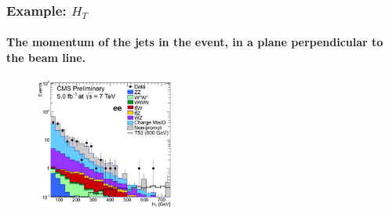 \documentclass[ukenglish]{beamer}
\begin{document}
\begin{frame}
    \frametitle{Example: $H_T$}
    \framesubtitle{The momentum of the jets in the event, in a plane
    perpendicular to the beam line.}
    \begin{figure}[h]
        \centering
            \includegraphics[width=0.4\textwidth]{ht}
    \end{figure}
\end{frame}

\end{document}
